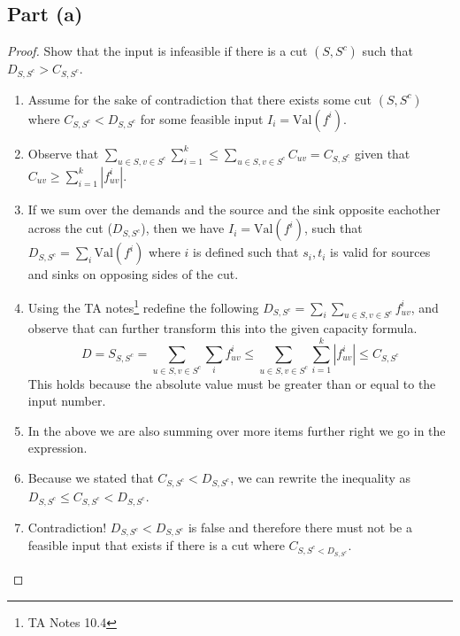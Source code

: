 \documentclass{article}
\begin{document}
\subsection{Part (a)}
\begin{proof} Show that the input is infeasible if there is a cut \((S,
      S^c)\) such that \(D_{S,S^c} > C_{S,S^c}\).
      \begin{enumerate}
            \item Assume for the sake of contradiction that there exists some cut
                  \((S,S^c)\) where \(C_{S,S^c} < D_{S,S^c}\) for some feasible input \(I_i =
                  \text{Val}(f^i)\).
            \item Observe that \( \sum_{u\in S, v\in S^c} \sum_{i=1}^{k} \leq
                  \sum_{u\in S, v \in S^c} C_{uv} = C_{S,S^c} \) given that \(C_{uv} \geq
                  \sum_{i=1}^{k}|f_{uv}^i| \).
            \item If we sum over the demands and the source and the sink opposite
                  eachother across the cut (\(D_{S,S^c}\)), then we have \(I_i =
                  \text{Val}(f^i)\), such that \(D_{S,S^c} = \sum_{i} \text{Val}(f^i)\)
                  where \(i\) is defined such that \(s_i, t_i\) is valid for sources and
                  sinks on opposing sides of the cut.
            \item Using the TA notes\footnote{TA Notes 10.4} redefine the following
                  \(D_{S,S^c} = \sum_i \sum_{u\in S, v\in S^c} f_{uv}^{i} \), and observe
                  that can further transform this into the given capacity formula.
                  \[ D = S_{S,S^c} = \sum_{u\in S, v \in S^c} \sum_i f_{uv}^i \leq \sum_{u
                              \in S, v \in S^c} \sum_{i=1}^{k} |f_{uv}^i| \leq C_{S,S^c}\]
                  This holds because the absolute value must be greater than
                  or equal to the input number.
            \item In the above we are also summing over more items further right we go in
                  the expression.
            \item Because we stated that \(C_{S,S^c} < D_{S,S^c}\), we can rewrite the
                  inequality as \(D_{S,S^c} \leq C_{S,S^c} < D_{S, S^c}\).
            \item Contradiction! \(D_{S,S^c} < D_{S,S^c}\) is false and therefore there
                  must not be a feasible input that exists if there is a cut where \(C_{S,S^c <
                              D_{S,S^c}}\).
      \end{enumerate}

\end{proof}
\end{document}
